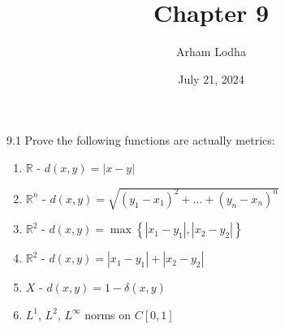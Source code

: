 \documentclass{article}
\newcommand{\R}{\mathbb{R}}
\newcommand{\abs}[1]{\left\lvert #1\right\rvert}
\begin{document}
\title{Chapter 9}
\author{Arham Lodha}%
\date{July 21, 2024}%
\maketitle

\begin{PROB}{9.1}\label{Problem 9.1.}
    Prove the following functions are actually metrics:
    \begin{enumerate}
        \item $\R$ - $d(x, y) = \abs{x - y}$
        \item $\R^n$ - $d(x, y) = \sqrt{(y_1 - x_1)^2 + \dots + (y_n - x_n)^n}$
        \item $\R^2$ - $d(x, y) = \max\left\{ \abs{x_1 - y_1}, \abs{x_2 - y_2} \right\}$
        \item $\R^2$ - $d(x, y) = \abs{x_1 - y_1} + \abs{x_2 - y_2}$
        \item $X$ - $d(x, y) = 1 - \delta(x, y)$
        \item $L^1$, $L^2$, $L^\infty$ norms on $C[0, 1]$               
    \end{enumerate}
    
\end{PROB}
\end{document}
